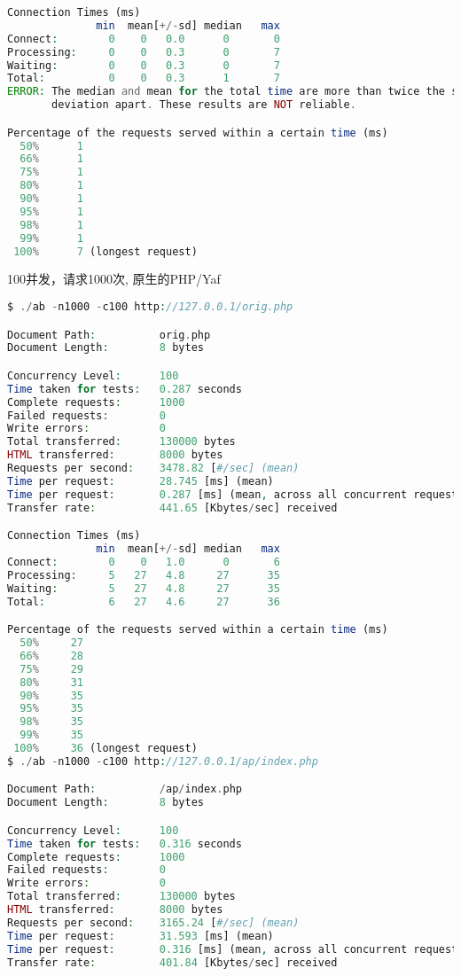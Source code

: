 \begin{compactitem}
\begin{lstlisting}[language=PHP]
Connection Times (ms)
              min  mean[+/-sd] median   max
Connect:        0    0   0.0      0       0
Processing:     0    0   0.3      0       7
Waiting:        0    0   0.3      0       7
Total:          0    0   0.3      1       7
ERROR: The median and mean for the total time are more than twice the standard
       deviation apart. These results are NOT reliable.

Percentage of the requests served within a certain time (ms)
  50%      1
  66%      1
  75%      1
  80%      1
  90%      1
  95%      1
  98%      1
  99%      1
 100%      7 (longest request)
\end{lstlisting}

\item 100并发，请求1000次, 原生的PHP/Yaf

\begin{lstlisting}[language=PHP]
$ ./ab -n1000 -c100 http://127.0.0.1/orig.php

Document Path:          orig.php
Document Length:        8 bytes

Concurrency Level:      100
Time taken for tests:   0.287 seconds
Complete requests:      1000
Failed requests:        0
Write errors:           0
Total transferred:      130000 bytes
HTML transferred:       8000 bytes
Requests per second:    3478.82 [#/sec] (mean)
Time per request:       28.745 [ms] (mean)
Time per request:       0.287 [ms] (mean, across all concurrent requests)
Transfer rate:          441.65 [Kbytes/sec] received

Connection Times (ms)
              min  mean[+/-sd] median   max
Connect:        0    0   1.0      0       6
Processing:     5   27   4.8     27      35
Waiting:        5   27   4.8     27      35
Total:          6   27   4.6     27      36

Percentage of the requests served within a certain time (ms)
  50%     27
  66%     28
  75%     29
  80%     31
  90%     35
  95%     35
  98%     35
  99%     35
 100%     36 (longest request)
$ ./ab -n1000 -c100 http://127.0.0.1/ap/index.php

Document Path:          /ap/index.php
Document Length:        8 bytes

Concurrency Level:      100
Time taken for tests:   0.316 seconds
Complete requests:      1000
Failed requests:        0
Write errors:           0
Total transferred:      130000 bytes
HTML transferred:       8000 bytes
Requests per second:    3165.24 [#/sec] (mean)
Time per request:       31.593 [ms] (mean)
Time per request:       0.316 [ms] (mean, across all concurrent requests)
Transfer rate:          401.84 [Kbytes/sec] received


\end{lstlisting}
\end{compactitem}
